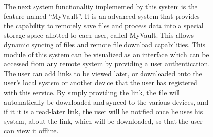 \documentclass[a4paper]{report}
\begin{document}
\newpage
\begin{figure}
\paragraph{}
\large\textnormal{The next system functionality implemented by this system is the feature named “MyVault”. It is an advanced system that provides the capability to remotely save files and process data into a special storage space allotted to each user, called MyVault. This allows dynamic syncing of files and remote file download capabilities. This module of this system can be visualized as an interface which can be accessed from any remote system by providing a user authentication. The user can add links to be viewed later, or downloaded onto the user’s local system or another device that the user has registered with this service. By simply providing the link, the file will automatically be downloaded and synced to the various devices, and if it it is a read-later link, the user will be notified once he uses his system, about the link, which will be downloaded, so that the user can view it offline.}
\end{figure}
\newpage
\end{document}
